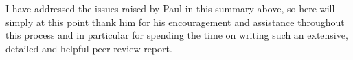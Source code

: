 \documentclass{article}
\begin{document}
I have addressed the issues raised by Paul in this summary above, so here will simply at this point thank him for his encouragement and assistance throughout this process and in particular for spending the time on writing such an extensive, detailed and helpful peer review report.



\end{document}
